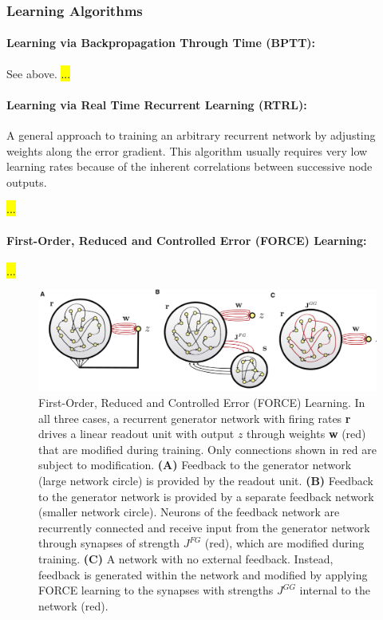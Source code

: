 \documentclass[main]{subfiles}
\begin{document}
\subsubsection{Learning Algorithms}
\paragraph{Learning via Backpropagation Through Time (BPTT):}

See above.
\hl{...}

\paragraph{Learning via Real Time Recurrent Learning (RTRL):}
A general approach to training an arbitrary recurrent network by adjusting weights along the error gradient. This algorithm usually requires very low learning rates because of the inherent correlations between successive node outputs.

\hl{...}

\paragraph{First-Order, Reduced and Controlled Error (FORCE) Learning:}

\hl{...}

\begin{figure}[H]
    \centering
    \includegraphics[width=0.99\linewidth]{13_LearningInRecurrentNeuronalNetworks/figures/force.png}
    \caption{First-Order, Reduced and Controlled Error (FORCE) Learning. In all three cases, a recurrent generator network with firing rates \textbf{r} drives a linear
    readout unit with output $z$ through weights \textbf{w} (red) that are modified during training. Only connections shown in red are subject to modification. \textbf{(A)} Feedback to the generator network (large network circle) is provided by the readout unit. \textbf{(B)} Feedback to the generator network is provided by a separate feedback network (smaller network circle). Neurons of the feedback network are recurrently connected and receive input from the generator network through synapses of strength $J^{FG}$ (red), which are modified during training. \textbf{(C)} A network with no external feedback. Instead, feedback is generated within the network and modified by applying FORCE learning to the synapses with strengths $J^{GG}$ internal to the network (red).}
    \label{fig:force}
\end{figure}
\end{document}
